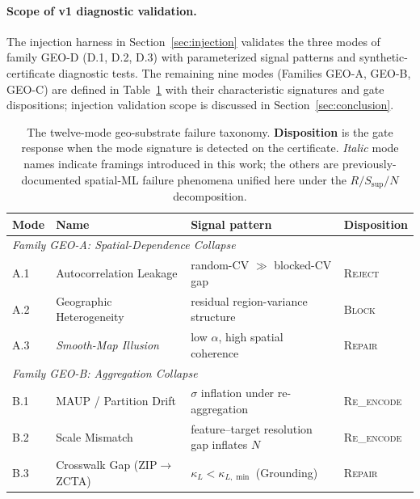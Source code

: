\documentclass{article}
\begin{document}
\paragraph{Scope of v1 diagnostic validation.} The injection harness in Section~\ref{sec:injection} validates the three modes of family GEO-D (D.1, D.2, D.3) with parameterized signal patterns and synthetic-certificate diagnostic tests. The remaining nine modes (Families GEO-A, GEO-B, GEO-C) are defined in Table~\ref{tab:taxonomy} with their characteristic signatures and gate dispositions; injection validation scope is discussed in Section~\ref{sec:conclusion}.

\begin{table}[htbp]
\centering
\caption{The twelve-mode geo-substrate failure taxonomy. \textbf{Disposition} is the gate response when the mode signature is detected on the certificate. \textit{Italic} mode names indicate framings introduced in this work; the others are previously-documented spatial-ML failure phenomena unified here under the $R/S_{\text{sup}}/N$ decomposition.}
\label{tab:taxonomy}
\small
\begin{tabular}{llll}
\toprule
\textbf{Mode} & \textbf{Name} & \textbf{Signal pattern} & \textbf{Disposition} \\
\midrule
\multicolumn{4}{l}{\textit{Family GEO-A: Spatial-Dependence Collapse}} \\
A.1 & Autocorrelation Leakage                   & random-CV $\gg$ blocked-CV gap                                        & \textsc{Reject}    \\
A.2 & Geographic Heterogeneity                  & residual region-variance structure                                    & \textsc{Block}     \\
A.3 & \textit{Smooth-Map Illusion}              & low $\alpha$, high spatial coherence                                  & \textsc{Repair}    \\
\midrule
\multicolumn{4}{l}{\textit{Family GEO-B: Aggregation Collapse}} \\
B.1 & MAUP / Partition Drift                    & $\sigma$ inflation under re-aggregation                               & \textsc{Re\_encode} \\
B.2 & Scale Mismatch                            & feature--target resolution gap inflates $N$                           & \textsc{Re\_encode} \\
B.3 & Crosswalk Gap (ZIP$\to$ZCTA)              & $\kappa_L < \kappa_{L,\min}$ (Grounding)                              & \textsc{Repair}    \\

\end{tabular}
\end{table}
\end{document}
